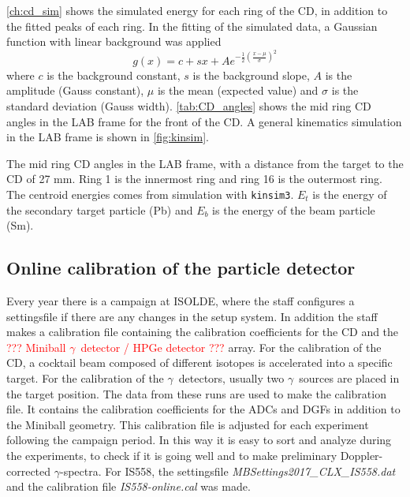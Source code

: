 \documentclass[twoside,english]{uiofysmaster/uiofysmaster}
\newcommand{\ga}{$\gamma$}
\let\orgautoref\autoref
\renewcommand{\autoref}
        {%
		 \def\sectionautorefname{Section}%
		 \def\subsectionautorefname{Section}%
		 \def\subsubsectionautorefname{Section}%
		 \def\chapterautorefname{Chapter}%
          \orgautoref}
\begin{document}
\autoref{ch:cd_sim} shows the simulated energy for each ring of the CD, in addition to the fitted peaks of each ring.
In the fitting of the simulated data, a Gaussian function with linear background was applied
\begin{equation}
	g(x) = c + sx + A e^{-\frac{1}{2}\left(\frac{x - \mu}{\sigma}\right)^2}
\end{equation}
where $c$ is the background constant, $s$ is the background slope, $A$ is the amplitude (Gauss constant), $\mu$ is the mean (expected value) and $\sigma$ is the standard deviation (Gauss width). 
\autoref{tab:CD_angles} shows the mid ring CD angles in the LAB frame for the front of the CD. 
A general kinematics simulation in the LAB frame is shown in \autoref{fig:kinsim}. 

\begin{table}[ht] 
    \centering 
    \caption{The mid ring CD angles in the LAB frame, with a distance from the target to the CD of 27 mm. 
    Ring 1 is the innermost ring and ring 16 is the outermost ring. 
    The centroid energies comes from simulation with \texttt{kinsim3}. 
    $E_t$ is the energy of the secondary target particle (Pb) and $E_b$ is the energy of the beam particle (Sm).}
	
	\label{tab:CD_angles}
\end{table}



\subsection{Online calibration of the particle detector}\label{ssec:online_cal}
Every year there is a campaign at ISOLDE, where the staff configures a settingsfile if there are any changes in the setup system. 
In addition the staff makes a calibration file containing the calibration coefficients for the CD and the \textcolor{red}{??? Miniball \ga\ detector / HPGe detector ???} array. 
For the calibration of the CD, a cocktail beam composed of different isotopes is accelerated into a specific target. 
For the calibration of the \ga\ detectors, usually two \ga\ sources are placed in the target position.
The data from these runs are used to make the calibration file. 
It contains the calibration coefficients for the ADCs and DGFs in addition to the Miniball geometry.
This calibration file is adjusted for each experiment following the campaign period.
In this way it is easy to sort and analyze during the experiments, to check if it is going well and to make preliminary Doppler-corrected \ga-spectra.
For IS558, the settingsfile \textit{MBSettings2017\_CLX\_IS558.dat} and the calibration file \textit{IS558-online.cal} was made.
\end{document}
